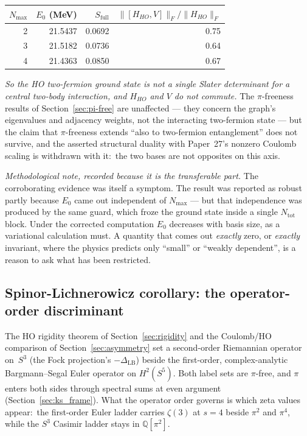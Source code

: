 \documentclass[twocolumn,pra,amsmath,amssymb,superscriptaddress]{revtex4-2}
\begin{document}
\begin{center}
\begin{tabular}{rrrr}
\hline
$N_{\max}$ & $E_{0}$ (MeV) & $S_{\mathrm{full}}$ &
$\lVert[H_{HO},V]\rVert_F / \lVert H_{HO}\rVert_F$ \\
\hline
2 & 21.5437 & 0.0692 & 0.75 \\
3 & 21.5182 & 0.0736 & 0.64 \\
4 & 21.4363 & 0.0850 & 0.67 \\
\hline
\end{tabular}
\end{center}

\emph{So the HO two-fermion ground state is not a single Slater determinant for
a central two-body interaction, and $H_{HO}$ and $V$ do not commute.}  The
$\pi$-freeness results of Section~\ref{sec:pi-free} are unaffected --- they
concern the graph's eigenvalues and adjacency weights, not the interacting
two-fermion state --- but the claim that $\pi$-freeness extends ``also to
two-fermion entanglement'' does not survive, and the asserted structural
duality with Paper~27's nonzero Coulomb scaling is withdrawn with it:\ the two
bases are not opposites on this axis.

\emph{Methodological note, recorded because it is the transferable part.}  The
corroborating evidence was itself a symptom.  The result was reported as robust
partly because $E_{0}$ came out independent of $N_{\max}$ --- but that
independence was produced by the same guard, which froze the ground state
inside a single $N_{\mathrm{tot}}$ block.  Under the corrected computation
$E_{0}$ decreases with basis size, as a variational calculation must.  A
quantity that comes out \emph{exactly} zero, or \emph{exactly} invariant, where
the physics predicts only ``small'' or ``weakly dependent'', is a reason to ask
what has been restricted.

\subsection{Spinor-Lichnerowicz corollary: the operator-order discriminant}
\label{sec:spinor-lichnerowicz}

The HO rigidity theorem of Section~\ref{sec:rigidity} and the
Coulomb/HO comparison of Section~\ref{sec:asymmetry} set a
second-order Riemannian operator on~$S^3$ (the Fock projection's
$-\Delta_{\mathrm{LB}}$) beside the first-order, complex-analytic
Bargmann--Segal Euler operator on $H^2(S^5)$.  Both label sets are
$\pi$-free, and $\pi$ enters both sides through spectral sums at even
argument (Section~\ref{sec:ks_frame}).  What the operator order governs
is which zeta values appear:\ the first-order Euler ladder carries
$\zeta(3)$ at $s = 4$ beside $\pi^2$ and $\pi^4$, while the $S^3$
Casimir ladder stays in $\mathbb{Q}[\pi^2]$.
\end{document}
